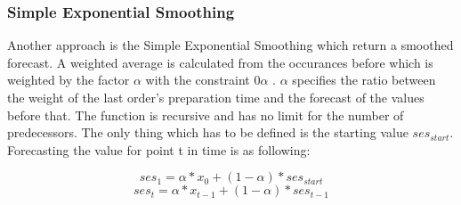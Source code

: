 \subsubsection{Simple Exponential Smoothing}\label{subsubsection:Simple Exponential Smoothing}
Another approach is the Simple Exponential Smoothing which return a smoothed forecast. A weighted average is calculated from the occurances before which is weighted by the factor $\alpha$ with the constraint 0\le $ \alpha$ . $ \alpha$  specifies the ratio between the weight of the last order's preparation time and the forecast of the values before that. The function is recursive and has no limit for the number of predecessors. The only thing which has to be defined is the starting value $ses_{start}$. Forecasting the value for point t in time is as following:

\begin{center}
\begin{equation}
ses_1=\alpha*x_{0}+(1-\alpha)*ses_{start}
\end{equation}
\begin{equation}
ses_t=\alpha*x_{t-1}+(1-\alpha)*ses_{t-1}
\end{equation}
\end{center}
